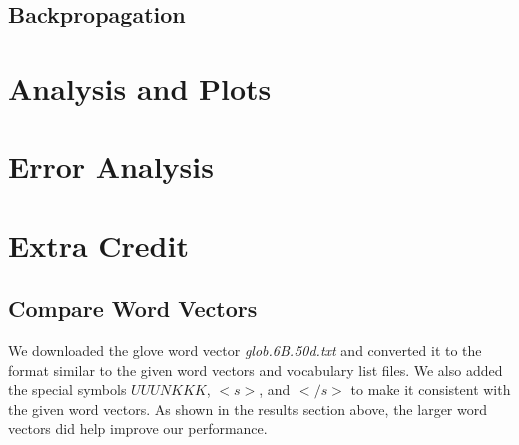 \documentclass[12pt]{article}
\begin{document}
\subsection{Backpropagation}



\section{Analysis and Plots}



\section{Error Analysis}



\section{Extra Credit}

\subsection{Compare Word Vectors}
We downloaded the glove word vector \textit{glob.6B.50d.txt} and converted it to the format similar to the given word vectors and vocabulary list files. We also added the special symbols $UUUNKKK$, $<s>$, and $</s>$ to make it consistent with the given word vectors. As shown in the results section above, the larger word vectors did help improve our performance.
\end{document}
